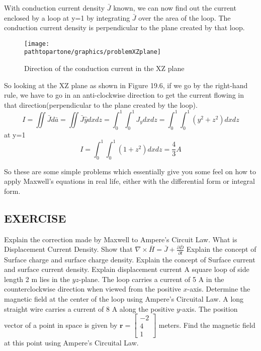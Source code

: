 \begin{exmp}
	With conduction current density $\bar{J}$ known, we can now find out the current enclosed by a loop at y=1 by integrating $\bar{J}$ over the area of the loop. The conduction current density is perpendicular to the plane created by that loop.
	\begin{figure}[h]
			\centering
			\texttt{[image: \\pathtopartone/graphics/problemXZplane]}
			\caption{Direction of the conduction current in the XZ plane}
		\end{figure} 
	So looking at the XZ plane as shown in Figure 19.6, if we go by the right-hand rule, we have to go in an anti-clockwise direction to get the current flowing in that direction(perpendicular to the plane created by the loop).
	\begin{dmath*}
			I=\iint\bar{J}d\bar{a}=\iint\bar{J}\hat{y}dxdz
			=\int_{0}^{1}\int_{0}^{1}J_{y}dxdz
			=\int_{0}^{1}\int_{0}^{1}(y^{2}+z^{2})dxdz
		\end{dmath*}
	at y=1
	\begin{dmath*}
			I=\int_{0}^{1}\int_{0}^{1}(1+z^{2})dxdz
			= \frac{4}{3}A
		\end{dmath*}
\end{exmp}
So these are some simple problems which essentially give you some feel on how to apply Maxwell's equations in real life, either with the differential form or integral form.


\begin{mdframed}[backgroundcolor=lightblue, linewidth=1pt, hidealllines=true]
	\section{EXERCISE}
	
	\begin{ExerciseList}
			\Exercise[label={ex11}]Explain the correction made by Maxwell to 		Ampere's Circuit Law.
			\Exercise[label={ex12}] What is Displacement Current Density.
			\Exercise[label={ex13}] Show that $\nabla\times\bar{H}=\bar{J}+\frac{\partial\bar{D}}{\partial t}$
			\Exercise[label={ex14}] Explain the concept of Surface charge and surface charge density.
			\Exercise[label={ex15}] Explain the concept of Surface current and surface current density.
			\Exercise[label={ex16}] Explain displacement current
			\Exercise[label={ex17}] A square loop of side length 2 m lies in the $yz$-plane. The loop carries a current of 5 A in the counterclockwise direction when viewed from the positive $x$-axis. Determine the magnetic field at the center of the loop using Ampere's Circuital Law.
			\Exercise[label={ex17}] A long straight wire carries a current of 8 A along the positive $y$-axis. The position vector of a point in space is given by $\mathbf{r} = \begin{bmatrix} -2 \\ 4 \\ 1 \end{bmatrix}$ meters. Find the magnetic field at this point using Ampere's Circuital Law.
		\end{ExerciseList}
\end{mdframed}